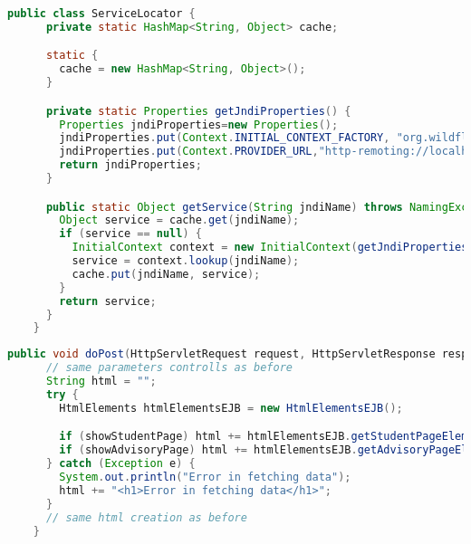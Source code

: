 \begin{lstlisting}[language=java, caption={The new ServiceLocator}]
    public class ServiceLocator {
      private static HashMap<String, Object> cache;

      static {
        cache = new HashMap<String, Object>();
      }

      private static Properties getJndiProperties() {
        Properties jndiProperties=new Properties();
        jndiProperties.put(Context.INITIAL_CONTEXT_FACTORY, "org.wildfly.naming.client.WildFlyInitialContextFactory");
        jndiProperties.put(Context.PROVIDER_URL,"http-remoting://localhost:8080");
        return jndiProperties;
      }

      public static Object getService(String jndiName) throws NamingException {
        Object service = cache.get(jndiName);
        if (service == null) {
          InitialContext context = new InitialContext(getJndiProperties());
          service = context.lookup(jndiName);
          cache.put(jndiName, service);
        }
        return service;
      }
    }
  \end{lstlisting}

\begin{lstlisting}[language=java, caption={The new Servlet doPost}]
    public void doPost(HttpServletRequest request, HttpServletResponse response) throws IOException {
      // same parameters controlls as before
      String html = "";
      try {
        HtmlElements htmlElementsEJB = new HtmlElementsEJB();

        if (showStudentPage) html += htmlElementsEJB.getStudentPageElement(matriculation);
        if (showAdvisoryPage) html += htmlElementsEJB.getAdvisoryPageElement(matriculation);
      } catch (Exception e) {
        System.out.println("Error in fetching data");
        html += "<h1>Error in fetching data</h1>";
      }
      // same html creation as before
    }
  \end{lstlisting}
